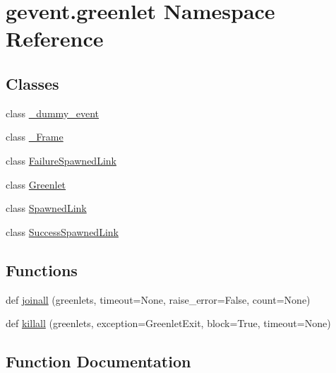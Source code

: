 \hypertarget{namespacegevent_1_1greenlet}{}\section{gevent.\+greenlet Namespace Reference}
\label{namespacegevent_1_1greenlet}
\subsection*{Classes}
\begin{DoxyCompactItemize}
\item 
class \hyperlink{classgevent_1_1greenlet_1_1__dummy__event}{\+\_\+dummy\+\_\+event}
\item 
class \hyperlink{classgevent_1_1greenlet_1_1___frame}{\+\_\+\+Frame}
\item 
class \hyperlink{classgevent_1_1greenlet_1_1_failure_spawned_link}{Failure\+Spawned\+Link}
\item 
class \hyperlink{classgevent_1_1greenlet_1_1_greenlet}{Greenlet}
\item 
class \hyperlink{classgevent_1_1greenlet_1_1_spawned_link}{Spawned\+Link}
\item 
class \hyperlink{classgevent_1_1greenlet_1_1_success_spawned_link}{Success\+Spawned\+Link}
\end{DoxyCompactItemize}
\subsection*{Functions}
\begin{DoxyCompactItemize}
\item 
def \hyperlink{namespacegevent_1_1greenlet_aa0aafeae4b59c0d3c72c3f6150b245ed}{joinall} (greenlets, timeout=None, raise\+\_\+error=False, count=None)
\item 
def \hyperlink{namespacegevent_1_1greenlet_a9dcac8b6723aad4f23d624e15c42f661}{killall} (greenlets, exception=Greenlet\+Exit, block=True, timeout=None)
\end{DoxyCompactItemize}


\subsection{Function Documentation}
\mbox{\label{namespacegevent_1_1greenlet_aa0aafeae4b59c0d3c72c3f6150b245ed}} 
